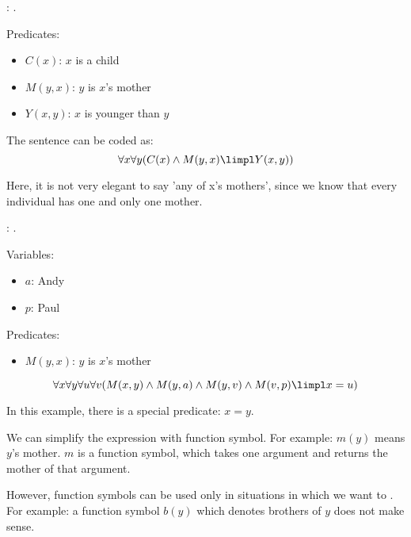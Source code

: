     : .
      \par Predicates:
      \begin{itemize}
        \item $C(x)$: $x$ is a child
        \item $M(y, x)$: $y$ is $x$'s mother
        \item $Y(x, y)$: $x$ is younger than $y$
      \end{itemize}
      \par The sentence can be coded as:
        \[
          \forall x \forall y (C(x) \land M(y, x) \limpl Y(x, y))
        \]
      \par Here, it is not very elegant to say 'any of x’s mothers', since we know that every individual has one and only one mother.

    : .
      \par Variables:
        \begin{itemize}
          \item $a$: Andy
          \item $p$: Paul
        \end{itemize}
      \par Predicates:
        \begin{itemize}
          \item $M(y, x)$: $y$ is $x$'s mother
        \end{itemize}
      \[
        \forall x \forall y \forall u \forall v (M(x, y) \land M(y, a) \land M(y, v) \land M(v, p) \limpl x = u)
      \]
      \par In this example, there is a special predicate: $x = y$.

      \par We can simplify the expression with function symbol. For example: $m(y)$ means $y$'s mother. $m$ is a function symbol, which takes one argument and returns the mother of that argument.
      \par However, function symbols can be used only in situations in which we want to . For example: a function symbol $b(y)$ which denotes brothers of $y$ does not make sense.


